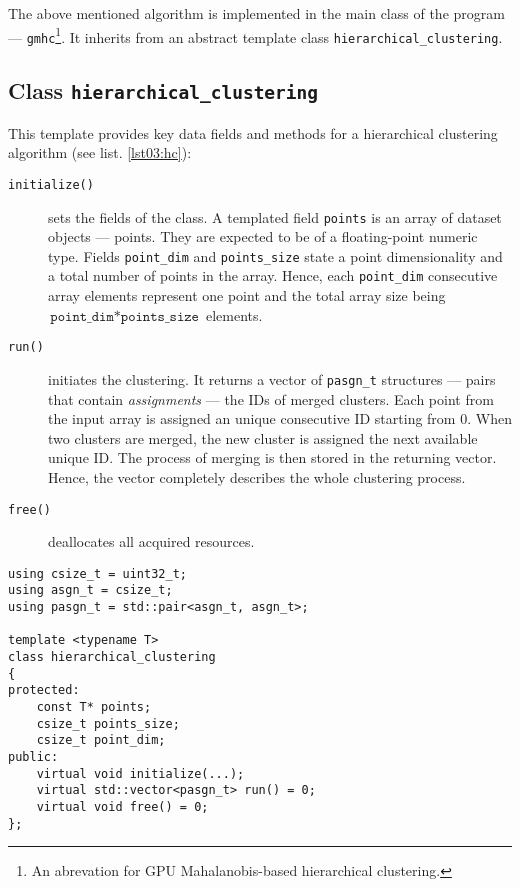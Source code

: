 The above mentioned algorithm is implemented in the main class of the program --- \texttt{gmhc}\footnote{An abrevation for GPU Mahalanobis-based hierarchical clustering.}. It inherits from an abstract template class \texttt{hierarchical\_clustering}.

\subsection{Class \texttt{hierarchical\_clustering}}
This template provides key data fields and methods for a hierarchical clustering algorithm (see list. \ref{lst03:hc}): 

\begin{description}
	\item[\texttt{initialize()}] sets the fields of the class. A templated field \texttt{points} is an array of dataset objects --- points. They are expected to be of a floating-point numeric type. Fields \texttt{point\_dim} and \texttt{points\_size} state a point dimensionality and a total number of points in the array. Hence, each \texttt{point\_dim} consecutive array elements represent one point and the total array size being $\texttt{point\_dim}*\texttt{points\_size}$ elements.
	
	\item[\texttt{run()}] initiates the clustering. It returns a vector of \texttt{pasgn\_t} structures --- pairs that contain \emph{assignments} --- the IDs of merged clusters. Each point from the input array is assigned an unique consecutive ID starting from $0$. When two clusters are merged, the new cluster is assigned the next available unique ID. The process of merging is then stored in the returning vector. Hence, the vector completely describes the whole clustering process.
	
	\item[\texttt{free()}] deallocates all acquired resources.
\end{description}

\begin{lstlisting}[caption={A summary of \texttt{hierarchical\_clustering} header file.},label={lst03:hc}]
using csize_t = uint32_t;
using asgn_t = csize_t;
using pasgn_t = std::pair<asgn_t, asgn_t>;

template <typename T>
class hierarchical_clustering
{
protected:
	const T* points;
	csize_t points_size;
	csize_t point_dim;
public:
	virtual void initialize(...);
	virtual std::vector<pasgn_t> run() = 0;
	virtual void free() = 0;
};
\end{lstlisting}

